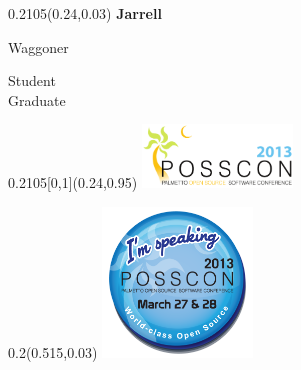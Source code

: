\documentclass[a4paper]{article}
\begin{document}
\begin{textblock}{0.2105}(0.24,0.03)
  {\fontsize{36}{40} \textbf{Jarrell} } \\
  \begin{Large} Waggoner \end{Large}

  \vspace{2em}

  Student \\ Graduate
\end{textblock}

\begin{textblock}{0.2105}[0,1](0.24,0.95)
  \includegraphics[width=4cm]{fig/logo}
\end{textblock}



\begin{textblock}{0.2}(0.515,0.03)
  \includegraphics[width=4cm]{fig/speaking}
\end{textblock}


\end{document}
